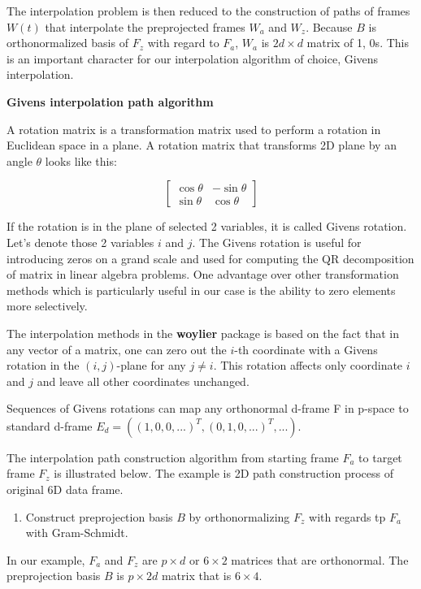 The interpolation problem is then reduced to the construction of paths
of frames \(W(t)\) that interpolate the preprojected frames \(W_a\) and
\(W_z\). Because \(B\) is orthonormalized basis of \(F_z\) with regard
to \(F_a\), \(W_a\) is \(2d\times d\) matrix of 1, 0s. This is an
important character for our interpolation algorithm of choice, Givens
interpolation.

\textbf{Givens interpolation path algorithm}

A rotation matrix is a transformation matrix used to perform a rotation
in Euclidean space in a plane. A rotation matrix that transforms 2D
plane by an angle \(\theta\) looks like this:

\[ \begin{bmatrix}\cos \theta &-\sin \theta \\\sin \theta &\cos \theta \end{bmatrix} \]

If the rotation is in the plane of selected 2 variables, it is called
Givens rotation. Let's denote those 2 variables \(i\) and \(j\). The
Givens rotation is useful for introducing zeros on a grand scale and
used for computing the QR decomposition of matrix in linear algebra
problems. One advantage over other transformation methods which is
particularly useful in our case is the ability to zero elements more
selectively.

The interpolation methods in the \textbf{woylier} package is based on
the fact that in any vector of a matrix, one can zero out the \(i\)-th
coordinate with a Givens rotation \citep{matrix_computation} in the
\((i, j)\)-plane for any \(j\neq i\). This rotation affects only
coordinate \(i\) and \(j\) and leave all other coordinates unchanged.

Sequences of Givens rotations can map any orthonormal d-frame F in
p-space to standard d-frame
\(E_d=((1, 0, 0, ...)^T, (0, 1, 0, ...)^T, ...)\).

The interpolation path construction algorithm from starting frame
\(F_a\) to target frame \(F_z\) is illustrated below. The example is 2D
path construction process of original 6D data frame.

\begin{enumerate}
\def\labelenumi{\arabic{enumi}.}
\tightlist
\item
  Construct preprojection basis \(B\) by orthonormalizing \(F_z\) with
  regards tp \(F_a\) with Gram-Schmidt.
\end{enumerate}

In our example, \(F_a\) and \(F_z\) are \(p\times d\) or \(6\times2\)
matrices that are orthonormal. The preprojection basis \(B\) is
\(p\times 2d\) matrix that is \(6\times 4\).

